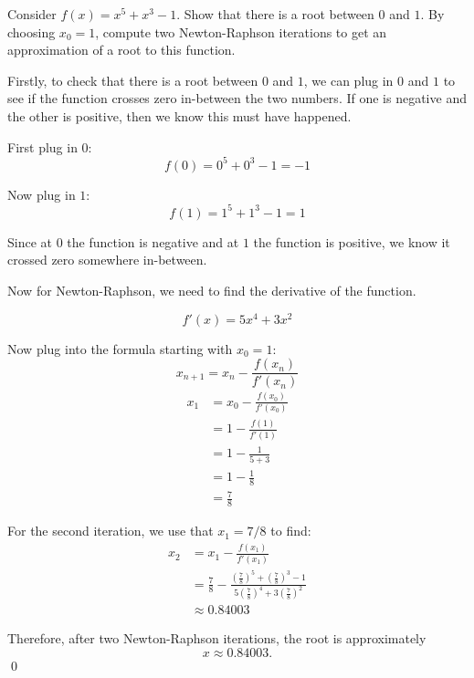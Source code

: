 \begin{example}
    Consider $f(x) = x^5 + x^3 - 1$. Show that there is a root between $0$ and $1$.
    By choosing $x_0 = 1$, compute two Newton-Raphson iterations to get an approximation of a root to this function.
\end{example}
\begin{solution}
    Firstly, to check that there is a root between $0$ and $1$, we can plug in $0$ and $1$ to see if the function crosses zero in-between the two numbers. If one is negative and the other is positive, then we know this must have happened.

    First plug in $0$:
    \[ f(0) = 0^5+0^3-1 = -1\]

    Now plug in $1$:
    \[ f(1) = 1^5 + 1^3 - 1 = 1\]

    Since at $0$ the function is negative and at $1$ the function is positive, we know it crossed zero somewhere in-between.

    Now for Newton-Raphson, we need to find the derivative of the function.

    \[f'(x) = 5x^4 + 3x^2 \]

    Now plug into the formula starting with $x_0 = 1$:
    \[ x_{n+1} = x_n - \frac{f(x_n)}{f'(x_n)}\]
    \begin{align*}
        x_1 &= x_0 - \frac{f(x_0)}{f'(x_0)} \\
         &= 1 - \frac{f(1)}{f'(1)}\\
         &= 1 - \frac{1}{5 + 3 } \\
         &= 1 - \frac{1}{8}\\
         &= \frac{7}{8}
    \end{align*}

    For the second iteration, we use that $x_1 = 7/8$ to find:
    \begin{align*}
        x_2 &= x_1 - \frac{f(x_1)}{f'(x_1)} \\
            &= \frac{7}{8} - 
            \frac{\left(\frac{7}{8}\right)^5 + \left(\frac{7}{8}\right)^3 - 1}
            {5\left(\frac{7}{8}\right)^4 + 3\left(\frac{7}{8}\right)^2} \\
            &\approx 0.84003
    \end{align*}

    Therefore, after two Newton-Raphson iterations, the root is approximately
    \[
        x \approx 0.84003.
    \]
    \qed
\end{solution}
